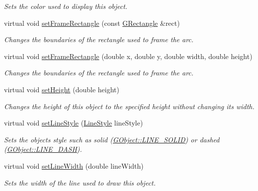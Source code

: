 \begin{DoxyCompactItemize}
\begin{DoxyCompactList}\small\item\em Sets the color used to display this object. \end{DoxyCompactList}\item 
virtual void \mbox{\hyperlink{classsgl_1_1GArc_a53c45f6939e63ae1ee26739e7c485e2d}{set\+Frame\+Rectangle}} (const \mbox{\hyperlink{structsgl_1_1GRectangle}{G\+Rectangle}} \&rect)
\begin{DoxyCompactList}\small\item\em Changes the boundaries of the rectangle used to frame the arc. \end{DoxyCompactList}\item 
virtual void \mbox{\hyperlink{classsgl_1_1GArc_a9532c0e65946d2f533f3c9abf8150a1d}{set\+Frame\+Rectangle}} (double x, double y, double width, double height)
\begin{DoxyCompactList}\small\item\em Changes the boundaries of the rectangle used to frame the arc. \end{DoxyCompactList}\item 
virtual void \mbox{\hyperlink{classsgl_1_1GObject_a9e280bfc4544dfaf8e4376c4e1a74357}{set\+Height}} (double height)
\begin{DoxyCompactList}\small\item\em Changes the height of this object to the specified height without changing its width. \end{DoxyCompactList}\item 
virtual void \mbox{\hyperlink{classsgl_1_1GObject_add11575087eb94f1a71faa3f826c6341}{set\+Line\+Style}} (\mbox{\hyperlink{classsgl_1_1GObject_a86e0f5648542856159bb40775c854aa7}{Line\+Style}} line\+Style)
\begin{DoxyCompactList}\small\item\em Sets the object\textquotesingle{}s style such as solid (\mbox{\hyperlink{classsgl_1_1GObject_a86e0f5648542856159bb40775c854aa7a700c78bc2cd76acaab26651bf7b4941f}{G\+Object\+::\+L\+I\+N\+E\+\_\+\+S\+O\+L\+ID}}) or dashed (\mbox{\hyperlink{classsgl_1_1GObject_a86e0f5648542856159bb40775c854aa7a9ccba0845f785d81d07b333ae1aad84e}{G\+Object\+::\+L\+I\+N\+E\+\_\+\+D\+A\+SH}}). \end{DoxyCompactList}\item 
virtual void \mbox{\hyperlink{classsgl_1_1GObject_afd6a47c6ea6a1f85ca05a65ba3ff3477}{set\+Line\+Width}} (double line\+Width)
\begin{DoxyCompactList}\small\item\em Sets the width of the line used to draw this object. \end{DoxyCompactList}\item 

\end{DoxyCompactItemize}
